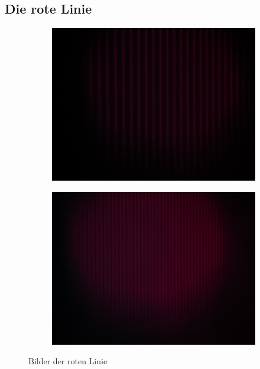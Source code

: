 \subsection{Die rote Linie}
\begin{figure}
  \centering
  \begin{subfigure}{0.4\textwidth}
    \centering
    \includegraphics[width=\textwidth]{Bilder/rot_sigma_ohne_B.JPG}
  \end{subfigure}
  \begin{subfigure}{0.4\textwidth}
    \centering
    \includegraphics[width=\textwidth]{Bilder/rot_sigma_mit_B.JPG}
  \end{subfigure}
  \caption{Bilder der roten Linie}
  \label{fig:rote_Linie}
\end{figure}
